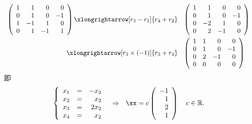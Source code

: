 \begin{jie}
\begin{itemize}
    $$
    \begin{array}{rl}
      \left(
      \begin{array}{rrrr}
        1&1&0&0\\
        0&1&0&-1\\
        1&-1&1&0\\
        0&1&-1&1
      \end{array}
                \right) \xlongrightarrow[r_3-r_1]{r_4+r_2} & 
                                                             \left(
                                                             \begin{array}{rrrr}
                                                               1&1&0&0\\
                                                               0&1&0&-1\\
                                                               0&-2&1&0\\
                                                               0&2&-1&0
                                                             \end{array}
                                                                       \right) \\[0.3in]
      \xlongrightarrow[r_3\times(-1)]{r_3+r_4}&
                                                \left(
                                                \begin{array}{rrrr}
                                                  1&1&0&0\\
                                                  0&1&0&-1\\
                                                  0&2&-1&0\\
                                                  0&0&0&0
                                                \end{array}
                                                         \right)         
    \end{array}
    $$  
    即
    $$
    \left\{
      \begin{array}{rcr}
        x_1&=&-x_2\\
        x_2&=&x_2\\
        x_3&=&2x_2\\
        x_4&=&x_2
      \end{array}
    \right.  ~~ \Rightarrow ~~
    \xx = c\left(
      \begin{array}{r}
        -1\\1\\2\\1
      \end{array}
    \right) \quad c\in \mathbb R.
    $$
  \end{itemize}
\end{jie}




